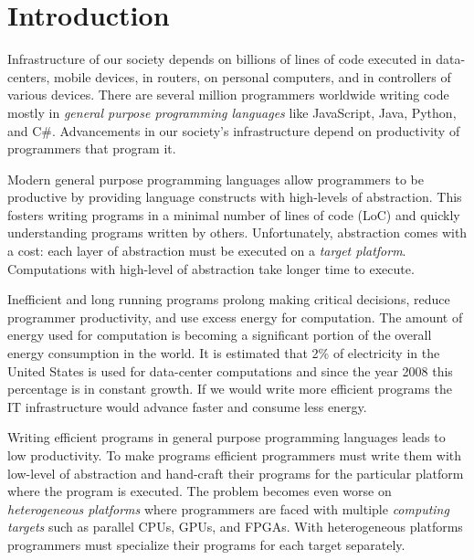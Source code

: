 \chapter{Introduction}
\label{sct:introduction}

Infrastructure of our society depends on billions of lines of code executed in data-centers,
 mobile devices, in routers, on personal computers, and in controllers of various devices. There are
 several million programmers worldwide writing code mostly in \emph{general purpose programming languages} like JavaScript, Java, Python, and C\#. Advancements in our society's infrastructure depend on productivity of programmers that program it.

Modern general purpose programming languages allow programmers to be productive by
 providing language constructs with high-levels of abstraction. This fosters writing
 programs in a minimal number of lines of code (LoC) and quickly understanding
 programs written by others. Unfortunately, abstraction comes with a cost: each layer of
 abstraction must be executed on a \emph{target platform}. Computations with high-level
 of abstraction take longer time to execute.

Inefficient and long running programs prolong making critical decisions, reduce programmer productivity, and use excess energy for computation. The amount of energy used for computation is becoming a significant portion of the overall energy consumption in the world.
 It is estimated that 2\%  of electricity in the United States is used for data-center computations and since
 the year 2008 this percentage is in constant growth. If we would write more efficient
 programs the IT infrastructure would advance faster and consume less energy.

Writing efficient programs in general purpose programming languages leads to low productivity.
 To make programs efficient programmers must write them with low-level of abstraction and hand-craft their programs for the particular platform where the program is executed. The problem becomes even worse on \emph{heterogeneous platforms} where programmers are faced
 with multiple \emph{computing targets} such as parallel CPUs, GPUs, and FPGAs. With heterogeneous
 platforms programmers must specialize their programs for each target separately.

